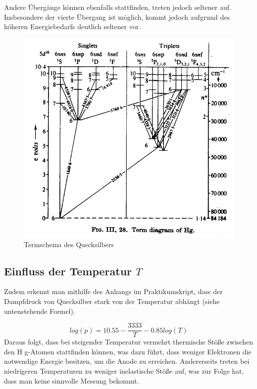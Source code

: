 \documentclass{article}
\begin{document}
\begin{multicols}{2}
Andere Übergänge können ebenfalls stattfinden, treten jedoch seltener auf. Insbesondere der vierte Übergang ist möglich, 
kommt jedoch aufgrund des höheren Energiebedarfs deutlich seltener vor.
\begin{figure}[H]
  \centering
  \includegraphics[scale=0.45]{Vereinfachtes Hg-Termschema.png}
  \caption{Termschema des Quecksilbers}
\end{figure}
\subsection{Einfluss der Temperatur $T$}
Zudem erkennt man mithilfe des Anhangs im Praktikumskript, dass der Dampfdruck von 
Quecksilber stark von der Temperatur abhängt (siehe untenstehende Formel).

\begin{equation*}
  log(p) = 10.55 - \frac{3333}{T} - 0.85log(T)
\end{equation*}
Daraus folgt, dass bei steigender Temperatur vermehrt thermische Stöße zwischen den H
g-Atomen stattfinden können, was dazu führt, dass weniger Elektronen die notwendige 
Energie besitzen, um die Anode zu erreichen. Andererseits treten bei niedrigeren 
Temperaturen zu weniger inelastische Stöße auf, was zur Folge hat, dass man keine sinnvolle
Messung bekommt.


\end{multicols}
\end{document}
